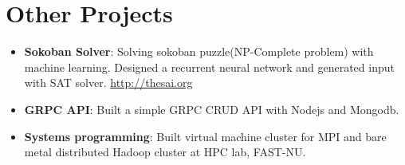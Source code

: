 \documentclass[letterpaper,11pt]{article}
\newcommand{\resumeItem}[2]{
\item\small{
\textbf{#1}{: #2 \vspace{-2pt}}
}
}
\newcommand{\resumeSubItem}[2]{\resumeItem{#1}{#2}\vspace{-4pt}}
\newcommand{\resumeSubHeadingListStart}{\begin{itemize}[leftmargin=*]}
\newcommand{\resumeSubHeadingListEnd}{\end{itemize}}
\begin{document}

\section{Other Projects}
\resumeSubHeadingListStart
\resumeSubItem{Sokoban Solver}
{Solving sokoban puzzle(NP-Complete problem) with machine learning. Designed a recurrent neural network and generated input with SAT solver. \href {http://thesai.org/Downloads/Volume8No3/Paper_64-Generation_of_Sokoban_Stages_using_Recurrent.pdf}{http://thesai.org}} 
\resumeSubItem{GRPC API}
{Built a simple GRPC CRUD API with Nodejs and Mongodb.}

\resumeSubItem{Systems programming}
{Built virtual machine cluster for MPI and bare metal distributed Hadoop cluster at HPC lab, FAST-NU.}
\resumeSubHeadingListEnd



%


\end{document}
